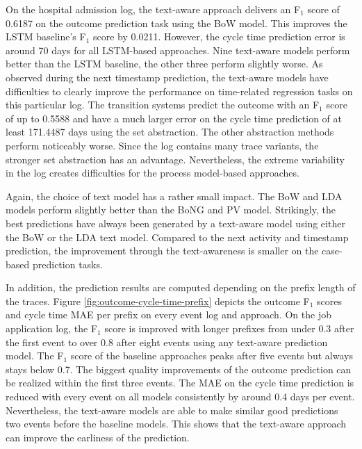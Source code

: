 On the hospital admission log, the text-aware approach delivers an F$_1$ score of 0.6187 on the outcome prediction task using the BoW model.
This improves the LSTM baseline's F$_1$ score by 0.0211.
However, the cycle time prediction error is around 70 days for all LSTM-based approaches.
Nine text-aware models perform better than the LSTM baseline, the other three perform slightly worse.
As observed during the next timestamp prediction, the text-aware models have difficulties to clearly improve the performance on time-related regression tasks on this particular log.
The transition systems predict the outcome with an F$_1$ score of up to 0.5588 and have a much larger error on the cycle time prediction of at least 171.4487 days using the set abstraction.
The other abstraction methods perform noticeably worse.
Since the log contains many trace variants, the stronger set abstraction has an advantage.
Nevertheless, the extreme variability in the log creates difficulties for the process model-based approaches.

Again, the choice of text model has a rather small impact.
The BoW and LDA models perform slightly better than the BoNG and PV model.
Strikingly, the best predictions have always been generated by a text-aware model using either the BoW or the LDA text model.
Compared to the next activity and timestamp prediction, the improvement through the text-awareness is smaller on the case-based prediction tasks.

In addition, the prediction results are computed depending on the prefix length of the traces.
Figure \ref{fig:outcome-cycle-time-prefix} depicts the outcome F$_1$ scores and cycle time MAE per prefix on every event log and approach.
On the job application log, the F$_1$ score is improved with longer prefixes from under 0.3 after the first event to over 0.8 after eight events using any text-aware prediction model.
The F$_1$ score of the baseline approaches peaks after five events but always stays below 0.7.
The biggest quality improvements of the outcome prediction can be realized within the first three events.
The MAE on the cycle time prediction is reduced with every event on all models consistently by around 0.4 days per event.
Nevertheless, the text-aware models are able to make similar good predictions two events before the baseline models.
This shows that the text-aware approach can improve the earliness of the prediction.

